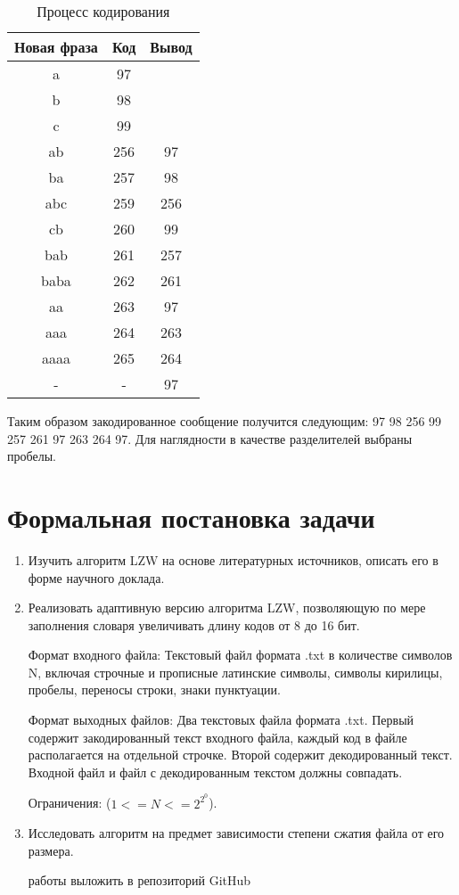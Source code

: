 \documentclass[a4paper]{article}
\begin{document}
\begin{table}[h]
\centering
\begin{tabular}{ |c|c|c| } 
 \hline
 Новая фраза & Код & Вывод \\
 \hline\hline
 a & 97 &  \\
 \hline
 b & 98 &  \\
 \hline
 c & 99 &  \\
 \hline
 ab & 256 & 97 \\
 \hline
 ba & 257 & 98 \\
 \hline
 abc & 259 & 256 \\
 \hline
 cb & 260 & 99 \\
 \hline
 bab & 261 & 257 \\
 \hline
 baba & 262 & 261 \\
 \hline
 aa & 263 & 97 \\
 \hline
 aaa & 264 & 263 \\
 \hline
 aaaa & 265 & 264 \\
 \hline
 - & - & 97 \\
 \hline
\end{tabular}
\caption{\label{tab:widgets}Процесс кодирования}
\end{table}

Таким образом закодированное сообщение получится следующим:
97 98 256 99 257 261 97 263 264 97. Для наглядности в качестве разделителей выбраны пробелы.

\newpage
\section{Формальная постановка задачи}
\begin{enumerate}
\item Изучить алгоритм LZW на основе литературных источников, описать его в форме научного доклада. 

\item Реализовать адаптивную версию алгоритма LZW, позволяющую по мере заполнения словаря увеличивать длину кодов от 8 до 16 бит. 

Формат входного файла:
Текстовый файл формата .txt в количестве символов N, включая строчные и прописные латинские символы, символы кирилицы, пробелы, переносы строки, знаки пунктуации. 

Формат выходных файлов:
Два текстовых файла формата .txt. Первый содержит закодированный текст входного файла, каждый код в файле располагается на отдельной строчке. Второй содержит декодированный текст. Входной файл и файл с декодированным текстом должны совпадать.

Ограничения:
($1<=N<=2^2^0$).

\item Исследовать алгоритм на предмет зависимости степени сжатия файла от его размера.

 работы выложить в репозиторий GitHub
\end{enumerate}
\newpage
\end{document}
